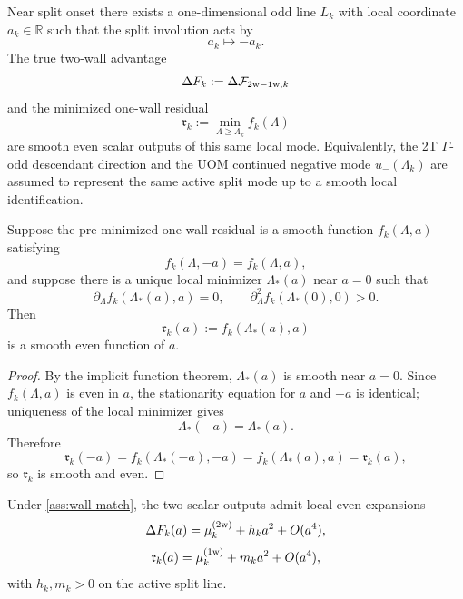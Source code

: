 \begin{assumption}
\label{ass:wall-match}
Near split onset there exists a one-dimensional odd line \(L_k\) with local coordinate \(a_k\in\mathbb R\) such that the
split involution acts by
\[
a_k\longmapsto -a_k.
\]
The true two-wall advantage
\[
\Delta F_k:=\Delta\mathcal F_{2{\rm w}-1{\rm w},k}
\]
and the minimized one-wall residual
\[
\mathfrak r_k:=\min_{\Lambda\ge \Lambda_k} f_k(\Lambda)
\]
are smooth even scalar outputs of this same local mode.
Equivalently, the 2T \(\Gamma\)-odd descendant direction and the UOM continued negative mode \(u_-(\Lambda_k)\) are
assumed to represent the same active split mode up to a smooth local identification.
\end{assumption}

\begin{lemma}
\label{lem:residual-even}
Suppose the pre-minimized one-wall residual is a smooth function \(f_k(\Lambda,a)\) satisfying
\[
f_k(\Lambda,-a)=f_k(\Lambda,a),
\]
and suppose there is a unique local minimizer \(\Lambda_\ast(a)\) near \(a=0\) such that
\[
\partial_\Lambda f_k(\Lambda_\ast(a),a)=0,
\qquad
\partial_\Lambda^2 f_k(\Lambda_\ast(0),0)>0.
\]
Then
\[
\mathfrak r_k(a):=f_k(\Lambda_\ast(a),a)
\]
is a smooth even function of \(a\).
\end{lemma}

\begin{proof}
By the implicit function theorem, \(\Lambda_\ast(a)\) is smooth near \(a=0\).
Since \(f_k(\Lambda,a)\) is even in \(a\), the stationarity equation for \(a\) and \(-a\) is identical; uniqueness of the
local minimizer gives
\[
\Lambda_\ast(-a)=\Lambda_\ast(a).
\]
Therefore
\[
\mathfrak r_k(-a)=f_k(\Lambda_\ast(-a),-a)=f_k(\Lambda_\ast(a),a)=\mathfrak r_k(a),
\]
so \(\mathfrak r_k\) is smooth and even.
\end{proof}

\begin{proposition}
\label{prop:rank-one-wall-match}
Under \cref{ass:wall-match}, the two scalar outputs admit local even expansions
\begin{equation}
\Delta F_k(a)
=
\mu_k^{(2{\rm w})}+h_k a^2+O(a^4),
\label{eq:DeltaF-detuned}
\end{equation}
\begin{equation}
\mathfrak r_k(a)
=
\mu_k^{(1{\rm w})}+m_k a^2+O(a^4),
\label{eq:rres-detuned}
\end{equation}
with \(h_k,m_k>0\) on the active split line.
\end{proposition}

